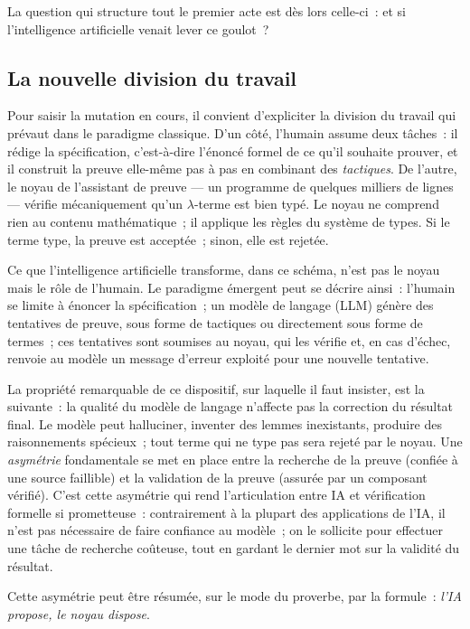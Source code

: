\documentclass[11pt,a4paper]{article}
\begin{document}
La question qui structure tout le premier acte est dès lors celle-ci~: et si l'intelligence artificielle venait lever ce goulot~?

\subsection{La nouvelle division du travail}

Pour saisir la mutation en cours, il convient d'expliciter la division du travail qui prévaut dans le paradigme classique. D'un côté, l'humain assume deux tâches~: il rédige la spécification, c'est-à-dire l'énoncé formel de ce qu'il souhaite prouver, et il construit la preuve elle-même pas à pas en combinant des \emph{tactiques}. De l'autre, le noyau de l'assistant de preuve --- un programme de quelques milliers de lignes --- vérifie mécaniquement qu'un $\lambda$-terme est bien typé. Le noyau ne comprend rien au contenu mathématique~; il applique les règles du système de types. Si le terme type, la preuve est acceptée~; sinon, elle est rejetée.

Ce que l'intelligence artificielle transforme, dans ce schéma, n'est pas le noyau mais le rôle de l'humain. Le paradigme émergent peut se décrire ainsi~: l'humain se limite à énoncer la spécification~; un modèle de langage (LLM) génère des tentatives de preuve, sous forme de tactiques ou directement sous forme de termes~; ces tentatives sont soumises au noyau, qui les vérifie et, en cas d'échec, renvoie au modèle un message d'erreur exploité pour une nouvelle tentative.

La propriété remarquable de ce dispositif, sur laquelle il faut insister, est la suivante~: la qualité du modèle de langage n'affecte pas la correction du résultat final. Le modèle peut halluciner, inventer des lemmes inexistants, produire des raisonnements spécieux~; tout terme qui ne type pas sera rejeté par le noyau. Une \emph{asymétrie} fondamentale se met en place entre la recherche de la preuve (confiée à une source faillible) et la validation de la preuve (assurée par un composant vérifié). C'est cette asymétrie qui rend l'articulation entre IA et vérification formelle si prometteuse~: contrairement à la plupart des applications de l'IA, il n'est pas nécessaire de faire confiance au modèle~; on le sollicite pour effectuer une tâche de recherche coûteuse, tout en gardant le dernier mot sur la validité du résultat.

Cette asymétrie peut être résumée, sur le mode du proverbe, par la formule~: \emph{l'IA propose, le noyau dispose}.
\end{document}
